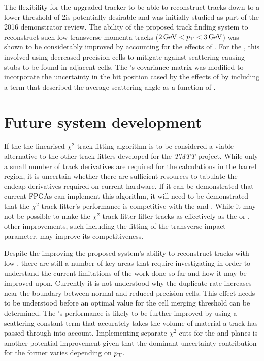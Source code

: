 The flexibility for the upgraded tracker to be able to reconstruct tracks down to a lower \pT threshold of 2\GeV is potentially desirable and was initially studied as part of the 2016 demonstrator review.
The ability of the proposed track finding system to reconstruct such low transverse momenta tracks ($2\,\text{Ge\hspace{-.08em}V} < p_{\mathrm{T}} < 3\,\text{Ge\hspace{-.08em}V}$) was shown to be considerably improved by accounting for the effects of \MS. 
For the \HT, this involved using decreased precision \HT cells to mitigate against scattering causing stubs to be found in adjacent cells.
The \KF's covariance matrix was modified to incorporate the uncertainty in the hit position cased by the effects of \MS by including a term that described the average scattering angle as a function of \pT.

\section{Future system development}
If the the linearised $\chi^{2}$ track fitting algorithm is to be considered a viable alternative to the other track fitters developed for the \emph{TMTT} project.
While only a small number of track derivatives are required for the calculations in the barrel region, it is uncertain whether there are sufficient resources to tabulate the endcap derivatives required on current hardware.
If it can be demonstrated that current FPGAs can implement this algorithm, it will need to be demonstrated that the $\chi^{2}$ track fitter's performance is competitive with the \KF and \LR.
While it may not be possible to make the $\chi^{2}$ track fitter filter tracks as effectively as the \KF or \LR , other improvements, such including the fitting of the transverse impact parameter, may improve its competitiveness.

Despite the improving the proposed system's ability to reconstruct tracks with low \pT, there are still a number of key areas that require investigating in order to understand the current limitations of the work done so far and how it may be improved upon.
Currently it is not understood why the duplicate rate increases near the boundary between normal and reduced precision \HT cells.
This effect needs to be understood before an optimal value for the cell merging threshold can be determined.
The \KF's performance is likely to be further improved by using a scattering constant term that accurately takes the volume of material a track has passed through into account.
Implementing separate \KF $\chi^{2}$ cuts for the \rphi and \rz planes is another potential improvement given that the dominant uncertainty contribution for the former varies depending on $p_{\mathrm{T}}$.


